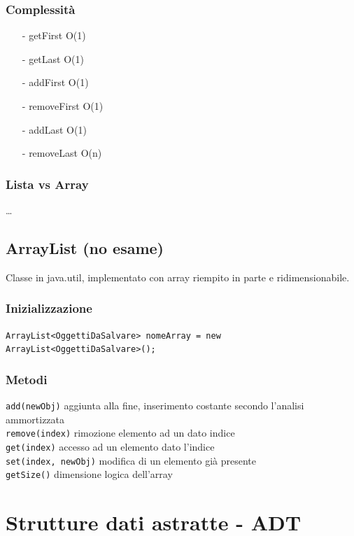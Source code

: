 \documentclass{article}
\begin{document}
\subsubsection*{Complessità}
\begin{itemize} [topsep=3pt, itemsep=0pt]
	\item[-] getFirst O(1)
	\item[-] getLast O(1)
	\item[-] addFirst O(1)
	\item[-] removeFirst O(1)
	\item[-] addLast O(1)
	\item[-] removeLast O(n)
\end{itemize}

\subsubsection*{Lista vs Array}
\dots

\newpage

\subsection{ArrayList (no esame)}
Classe in java.util, implementato con array riempito in parte e ridimensionabile.
\subsubsection*{Inizializzazione}
\verb|ArrayList<OggettiDaSalvare> nomeArray = new ArrayList<OggettiDaSalvare>();|

\subsubsection*{Metodi}
\verb|add(newObj)| aggiunta alla fine, inserimento costante secondo l'analisi ammortizzata \\
\verb|remove(index)| rimozione elemento ad un dato indice \\
\verb|get(index)| accesso ad un elemento dato l'indice \\
\verb|set(index, newObj)| modifica di un elemento già presente \\
\verb|getSize()| dimensione logica dell'array
\newpage

\section{Strutture dati astratte - ADT}
\end{document}
